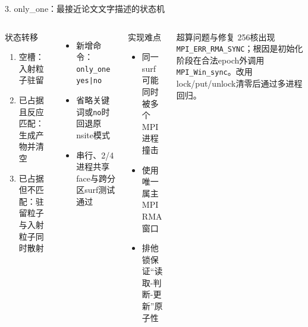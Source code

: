 \documentclass[aspectratio=169,11pt]{ctexbeamer}
\begin{document}
\begin{frame}{3. only\_one：最接近论文文字描述的状态机}
  \begin{columns}[T,totalwidth=\textwidth]
    \begin{block}{状态转移}
      \begin{enumerate}
        \item 空槽：入射粒子驻留
        \item 已占据且反应匹配：生成产物并清空
        \item 已占据但不匹配：驻留粒子与入射粒子同时散射
      \end{enumerate}
    \end{block}
    \begin{itemize}
      \item 新增命令：\texttt{only\_one yes|no}
      \item 省略关键词或\texttt{no}时回退原nsite模式
      \item 串行、2/4进程共享face与跨分区surf测试通过
    \end{itemize}
    \begin{block}{实现难点}
      \begin{itemize}
        \item 同一surf可能同时被多个MPI进程撞击
        \item 使用唯一属主MPI RMA窗口
        \item 排他锁保证“读取-判断-更新”原子性
      \end{itemize}
    \end{block}
    \begin{alertblock}{超算问题与修复}
      256核出现\texttt{MPI\_ERR\_RMA\_SYNC}；根因是初始化阶段在合法epoch外调用\texttt{MPI\_Win\_sync}。改用lock/put/unlock清零后通过多进程回归。
    \end{alertblock}
  \end{columns}
\end{frame}
\end{document}
